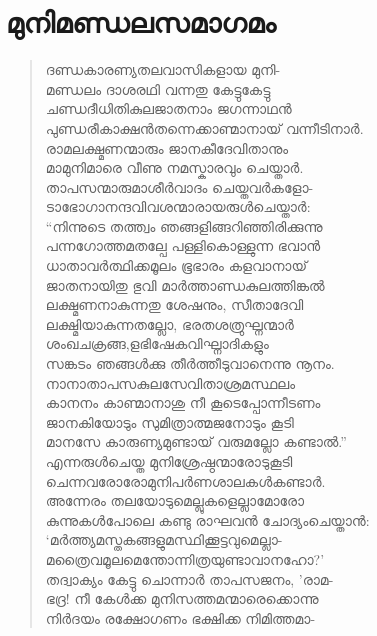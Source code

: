 \section{മുനിമണ്ഡലസമാഗമം}

\begin{verse}
ദണ്ഡകാരണ്യതലവാസികളായ മുനി-\\
മണ്ഡലം ദാശരഥി വന്നതു കേട്ടുകേട്ടു\\
ചണ്ഡദീധിതികുലജാതനാം ജഗന്നാഥന്‍\\
പുണ്ഡരീകാക്ഷന്‍തന്നെക്കാണ്മാനായ് വന്നീടിനാര്‍.\\
രാമലക്ഷ്മണന്മാരും ജാനകീദേവിതാനും\\
മാമുനിമാരെ വീണു നമസ്കാരവും ചെയ്താര്‍.\\
താപസന്മാരുമാശീര്‍വാദം ചെയ്തവര്‍കളോ-\\
ടാഭോഗാനന്ദവിവശന്മാരായരുള്‍ചെയ്താര്‍:\\
“നിന്നുടെ തത്ത്വം ഞങ്ങളിങ്ങറിഞ്ഞിരിക്കുന്നു\\
പന്നഗോത്തമതല്പേ പള്ളികൊള്ളുന്ന ഭവാന്‍\\
ധാതാവര്‍ത്ഥിക്കമൂലം ഭൂഭാരം കളവാനായ്\\
ജാതനായിതു ഭുവി മാര്‍ത്താണ്ഡകുലത്തിങ്കല്‍\\
ലക്ഷ്മണനാകുന്നതു ശേഷനും, സീതാദേവി\\
ലക്ഷ്മിയാകുന്നതല്ലോ, ഭരതശത്രുഘ്നന്മാര്‍\\
ശംഖചക്രങ്ങ,ളഭിഷേകവിഘ്നാദികളും\\
സങ്കടം ഞങ്ങള്‍ക്കു തീര്‍ത്തീടുവാനെന്നു നൂനം.\\
നാനാതാപസകുലസേവിതാശ്രമസ്ഥലം\\
കാനനം കാണ്മാനാശു നീ കൂടെപ്പോന്നീടണം\\
ജാനകിയോടും സുമിത്രാത്മജനോടും കൂടി\\
മാനസേ കാരുണ്യമുണ്ടായ് വരുമല്ലോ കണ്ടാല്‍.”\\
എന്നരുള്‍ചെയ്ത മുനിശ്രേഷ്ഠന്മാരോടുകൂടി\\
ചെന്നവരോരോമുനിപര്‍ണശാലകള്‍കണ്ടാര്‍.\\
അന്നേരം തലയോടുമെല്ലുകളെല്ലാമോരോ\\
കുന്നുകള്‍പോലെ കണ്ടു രാഘവന്‍ ചോദ്യംചെയ്താന്‍:\\
‘മര്‍ത്ത്യമസ്തകങ്ങളുമസ്ഥിക്കൂട്ടവുമെല്ലാ-\\
മത്രൈവമൂലമെന്തോന്നിത്രയുണ്ടാവാനഹോ?’\\
തദ്വാക്യം കേട്ടു ചൊന്നാര്‍ താപസജനം, ’രാമ-\\
ഭദ്ര! നീ കേള്‍ക്ക മുനിസത്തമന്മാരെക്കൊന്നു\\
നിര്‍ദയം രക്ഷോഗണം ഭക്ഷിക്ക നിമിത്തമാ-\\

\end{verse}
